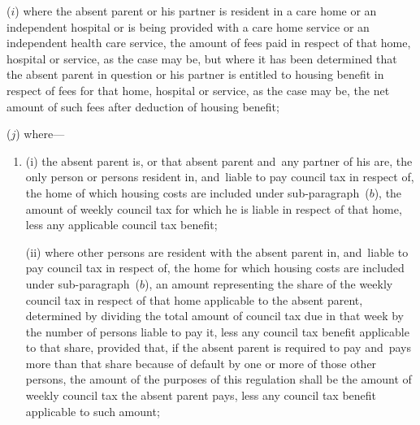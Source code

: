 \documentclass[12pt,a4paper]{article}
\begin{document}
\begin{enumerate}
%
%

($i$) where the absent parent or his partner is resident in a care home or an independent hospital or is being provided with a care home service or an independent health care service, the amount of fees paid in respect of that home, hospital or service, as the case may be, but where it has been determined that the absent parent in question or his partner is entitled to housing benefit in respect of fees for that home, hospital or service, as the case may be, the net amount of such fees after deduction of housing benefit;


($j$) where—
\begin{enumerate}\item[]
(i) the absent parent is, or that absent parent and~any partner of his are, the only person or persons resident in, and~liable to pay council tax in respect of, the home of which housing costs are included under sub-paragraph~($b$), the amount of weekly council tax for which he is liable in respect of that home, less any applicable council tax benefit;

(ii) where other persons are resident with the absent parent in, and~liable to pay council tax in respect of, the home for which housing costs are included under sub-paragraph~($b$), an amount representing the share of the weekly council tax in respect of that home applicable to the absent parent, determined by dividing the total amount of council tax due in that week by the number of persons liable to pay it, less any council tax benefit applicable to that share, provided that, if the absent parent is required to pay and~pays more than that share because of default by one or more of those other persons, the amount of the purposes of this regulation shall be the amount of weekly council tax the absent parent pays, less any council tax benefit applicable to such amount;
\end{enumerate}


\end{enumerate}
\end{document}
